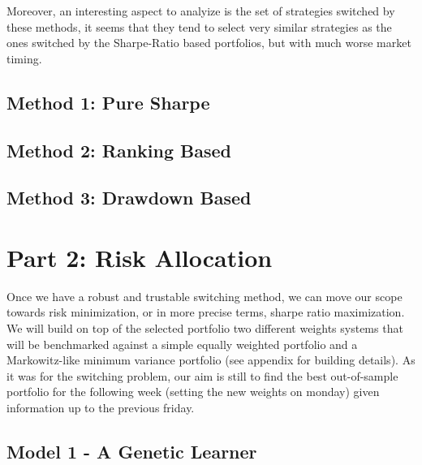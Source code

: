 \documentclass[12pt]{article} %
\numberwithin{equation}{subsection}
\begin{document}

Moreover, an interesting aspect to analyize is the set of strategies switched by these methods, it seems that they tend to select very similar strategies as the ones switched by the Sharpe-Ratio based portfolios, but with much worse market timing.\\

\subsection{Method 1: Pure Sharpe}




\subsection{Method 2: Ranking Based}




\subsection{Method 3: Drawdown Based}



\section{Part 2: Risk Allocation}

Once we have a robust and trustable switching method, we can move our scope towards risk minimization, or in more precise terms, sharpe ratio maximization. We will build on top of the selected portfolio two different weights systems that will be benchmarked against a simple equally weighted portfolio and a Markowitz-like minimum variance portfolio (see appendix for building details). As it was for the switching problem, our aim is still to find the best out-of-sample portfolio for the following week (setting the new weights on monday) given information up to the previous friday. \\

\subsection{Model 1 - A Genetic Learner}


\end{document}
